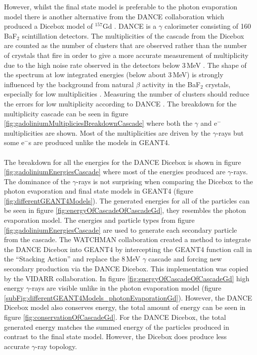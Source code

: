 
However, whilst the final state model is preferable to the photon evaporation model there is another alternative from the DANCE collaboration which produced a Dicebox model of $^{157}$Gd \cite{Chyzh_2011}. DANCE is a $\gamma$ calorimeter consisting of 160 BaF$_2$ scintillation detectors. The multiplicities of the cascade from the Dicebox are counted as the number of clusters that are observed rather than the number of crystals that fire in order to give a more accurate measurement of multiplicity due to the high noise rate observed in the detectors below 3\,MeV \cite{Chyzh_2011}. The shape of the spectrum at low integrated energies (below about 3\,MeV) is strongly influenced by the background from natural $\beta$ activity in the BaF$_2$ crystals, especially for low multiplicities \cite{Chyzh_2011}. Measuring the number of clusters should reduce the errors for low multiplicity according to DANCE \cite{Chyzh_2011}. The breakdown for the multiplicity cascade can be seen in figure \ref{fig:gadoliniumMultipliciesBreakdownCascade} where both the $\gamma$ and e$^-$ multiplicities are shown. Most of the multiplicities are driven by the $\gamma$-rays but some e$^-$s are produced unlike the models in GEANT4. 
\\\\The breakdown for all the energies for the DANCE Dicebox is shown in figure \ref{fig:gadoliniumEnergiesCascade} where most of the energies produced are $\gamma$-rays. The dominance of the $\gamma$-rays is not surprising when comparing the Dicebox to the photon evaporation and final state models in GEANT4 (figure \ref{fig:differentGEANT4Models}). The generated energies for all of the particles can be seen in figure \ref{fig:energyOfCascadeOfCascadeGd}, they resembles the photon evaporation model. The energies and particle types from figure \ref{fig:gadoliniumEnergiesCascade} are used to generate each secondary particle from the cascade. The WATCHMAN collaboration created a method to integrate the DANCE Dicebox into GEANT4 by intercepting the GEANT4 function call in the ``Stacking Action'' and replace the 8\,MeV $\gamma$ cascade and forcing new secondary production via the DANCE Dicebox. This implementation was copied by the VIDARR collaboration. In figure \ref{fig:energyOfCascadeOfCascadeGd} high energy $\gamma$-rays are visible unlike in the photon evaporation model (figure \ref{subFig:differentGEANT4Models_photonEvaporationGd}). However, the DANCE Dicebox model also conserves energy, the total amount of energy can be seen in figure  \ref{fig:conservationOfCascadeGd}. For the DANCE Dicebox, the total generated energy matches the summed energy of the particles produced in contrast to the final state model. However, the Dicebox does produce less accurate $\gamma$-ray topology.

